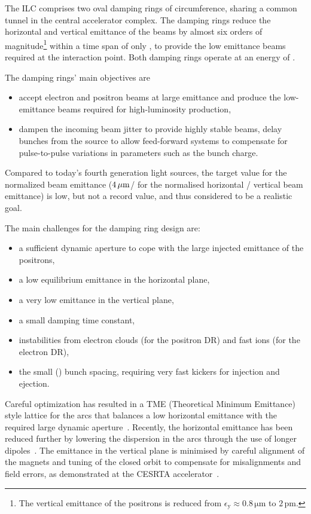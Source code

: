 The ILC comprises two oval damping rings of  circumference, sharing a common tunnel in the central accelerator complex.
The damping rings reduce the horizontal and vertical emittance of the beams by almost six orders of magnitude\footnote{The vertical emittance of the positrons is reduced from $\epsilon_{\mathrm{y}} \approx 0.8\,{\mathrm{\mu m}}$ to $2\,{\mathrm{pm}}$.} within a time span of only , to provide the low emittance beams required at the interaction point. 
Both damping rings operate at an energy of .

The damping rings' main objectives are
\begin{itemize} 
\item accept electron and positron beams at large emittance and produce the low-emittance beams required for high-luminosity production,
\item dampen the incoming beam jitter to provide highly stable beams,
delay bunches from the source to allow feed-forward systems to compensate for pulse-to-pulse variations in parameters such as the bunch charge.
\end{itemize}

Compared to today's fourth generation light sources, the target value for the normalized beam emittance ($4\,{\mathrm{\mu m}}$/ for the normalised horizontal / vertical beam emittance) is low, but not a record value, and thus considered to be a realistic goal.

The main challenges for the damping ring design are:
\begin{itemize} 
\item a sufficient dynamic aperture to cope with the large injected emittance of the positrons,
\item a low equilibrium emittance in the horizontal plane,
\item a very low emittance in the vertical plane,
\item a small damping time constant,
\item instabilities from electron clouds (for the positron DR) and fast ions (for the electron DR),
\item the small () bunch spacing, requiring very fast kickers for injection and ejection.
\end{itemize}

Careful optimization has resulted in a TME (Theoretical Minimum Emittance) style lattice for the arcs that balances a low horizontal emittance with the required large dynamic aperture~\cite[Chap. 6]{Adolphsen:2013kya}. 
Recently, the horizontal emittance has been reduced further by lowering the dispersion in the arcs through the use of longer dipoles~\cite{bib:cr-0016}.
The emittance in the vertical plane is minimised by careful alignment of the magnets and tuning of the closed orbit to compensate for misalignments and field errors, as demonstrated at the CESRTA accelerator~\cite{Billing:2011zc}.

